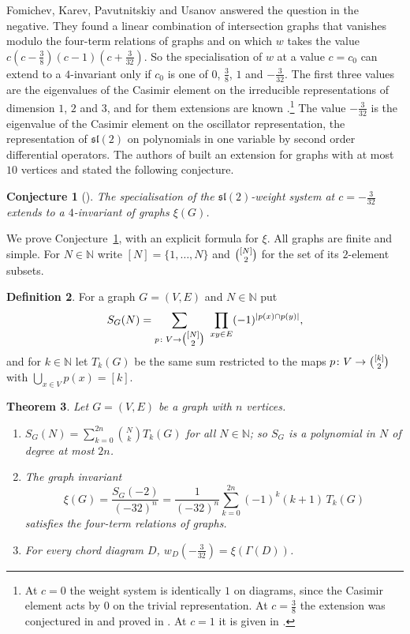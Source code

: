 \documentclass[11pt,a4paper,reqno]{amsart}
\newtheorem{theorem}{Theorem}[section]
\newtheorem{conjecture}[theorem]{Conjecture}
\theoremstyle{definition}
\newtheorem{definition}[theorem]{Definition}
\newcommand{\N}{\mathbb{N}}
\newcommand{\slt}{\mathfrak{sl}(2)}
\newcommand{\binomset}[2]{\tbinom{#1}{#2}}
\begin{document}
Fomichev, Karev, Pavutnitskiy and Usanov \cite{FKPU} answered the question in the negative. They found a linear combination of intersection graphs that vanishes modulo the four-term relations of graphs and on which $w$ takes the value $c(c-\frac38)(c-1)(c+\frac{3}{32})$. So the specialisation of $w$ at a value $c=c_0$ can extend to a $4$-invariant only if $c_0$ is one of $0$, $\frac38$, $1$ and $-\frac{3}{32}$. The first three values are the eigenvalues of the Casimir element on the irreducible representations of dimension $1$, $2$ and $3$, and for them extensions are known \cite{FKPU,FK25,YDJ26}.\footnote{At $c=0$ the weight system is identically $1$ on diagrams, since the Casimir element acts by $0$ on the trivial representation. At $c=\frac38$ the extension was conjectured in \cite{FK25} and proved in \cite{YDJ26}. At $c=1$ it is given in \cite{FKPU}.} The value $-\frac{3}{32}$ is the eigenvalue of the Casimir element on the oscillator representation, the representation of $\slt$ on polynomials in one variable by second order differential operators. The authors of \cite{FKPU} built an extension for graphs with at most $10$ vertices and stated the following conjecture.

\begin{conjecture}[{\cite[Section~4]{FKPU}}]\label{conj:fkpu}
The specialisation of the $\slt$-weight system at $c=-\frac{3}{32}$ extends to a $4$-invariant of graphs $\xi(G)$.
\end{conjecture}

We prove Conjecture~\ref{conj:fkpu}, with an explicit formula for $\xi$. All graphs are finite and simple. For $N\in\N$ write $[N]=\{1,\dots,N\}$ and $\binomset{[N]}{2}$ for the set of its $2$-element subsets.

\begin{definition}\label{def:S}
For a graph $G=(V,E)$ and $N\in\N$ put
\[
S_G(N)=\sum_{p\colon V\to\binomset{[N]}{2}}\ \prod_{xy\in E}(-1)^{|p(x)\cap p(y)|},
\]
and for $k\in\N$ let $T_k(G)$ be the same sum restricted to the maps $p\colon V\to\binomset{[k]}{2}$ with $\bigcup_{x\in V}p(x)=[k]$.
\end{definition}

\begin{theorem}\label{thm:main}
Let $G=(V,E)$ be a graph with $n$ vertices.
\begin{enumerate}
\item[(a)] $S_G(N)=\sum_{k=0}^{2n}\binom{N}{k}T_k(G)$ for all $N\in\N$; so $S_G$ is a polynomial in $N$ of degree at most $2n$.
\item[(b)] The graph invariant
\[
\xi(G)=\frac{S_G(-2)}{(-32)^{n}}=\frac{1}{(-32)^{n}}\sum_{k=0}^{2n}(-1)^k(k+1)\,T_k(G)
\]
satisfies the four-term relations of graphs.
\item[(c)] For every chord diagram $D$, $w_D(-\frac{3}{32})=\xi(\Gamma(D))$.
\end{enumerate}
\end{theorem}
\end{document}
